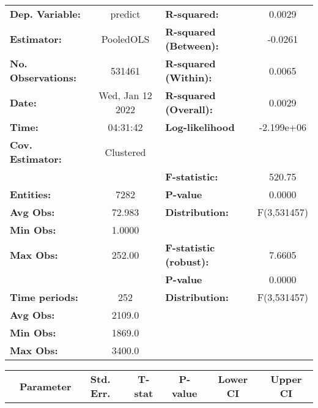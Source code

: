 \begin{center}
\begin{tabular}{lclc}
\toprule
\textbf{Dep. Variable:}    &      predict       & \textbf{  R-squared:         }   &      0.0029      \\
\textbf{Estimator:}        &     PooledOLS      & \textbf{  R-squared (Between):}  &     -0.0261      \\
\textbf{No. Observations:} &       531461       & \textbf{  R-squared (Within):}   &      0.0065      \\
\textbf{Date:}             &  Wed, Jan 12 2022  & \textbf{  R-squared (Overall):}  &      0.0029      \\
\textbf{Time:}             &      04:31:42      & \textbf{  Log-likelihood     }   &    -2.199e+06    \\
\textbf{Cov. Estimator:}   &     Clustered      & \textbf{                     }   &                  \\
\textbf{}                  &                    & \textbf{  F-statistic:       }   &      520.75      \\
\textbf{Entities:}         &        7282        & \textbf{  P-value            }   &      0.0000      \\
\textbf{Avg Obs:}          &       72.983       & \textbf{  Distribution:      }   &   F(3,531457)    \\
\textbf{Min Obs:}          &       1.0000       & \textbf{                     }   &                  \\
\textbf{Max Obs:}          &       252.00       & \textbf{  F-statistic (robust):} &      7.6605      \\
\textbf{}                  &                    & \textbf{  P-value            }   &      0.0000      \\
\textbf{Time periods:}     &        252         & \textbf{  Distribution:      }   &   F(3,531457)    \\
\textbf{Avg Obs:}          &       2109.0       & \textbf{                     }   &                  \\
\textbf{Min Obs:}          &       1869.0       & \textbf{                     }   &                  \\
\textbf{Max Obs:}          &       3400.0       & \textbf{                     }   &                  \\
\bottomrule
\end{tabular}
\begin{tabular}{lcccccc}
                & \textbf{Parameter} & \textbf{Std. Err.} & \textbf{T-stat} & \textbf{P-value} & \textbf{Lower CI} & \textbf{Upper CI}  \\

\end{tabular}
\end{center}
